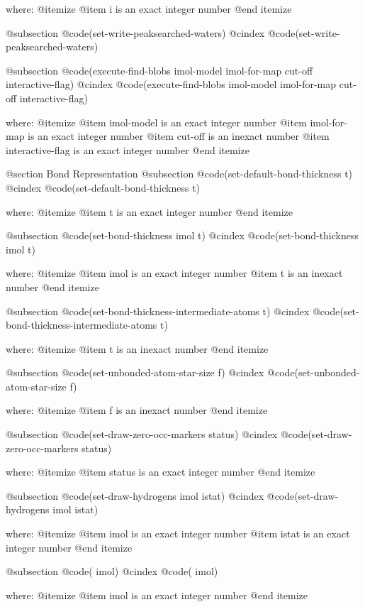 where: 
 @itemize 
     @item i is an exact integer number
 @end itemize


@subsection @code{(set-write-peaksearched-waters)}
@cindex @code{(set-write-peaksearched-waters)}
 
@subsection @code{(execute-find-blobs imol-model imol-for-map cut-off interactive-flag)}
@cindex @code{(execute-find-blobs imol-model imol-for-map cut-off interactive-flag)}
 
where: 
 @itemize 
     @item imol-model is an exact integer number
     @item imol-for-map is an exact integer number
     @item cut-off is an inexact number
     @item interactive-flag is an exact integer number
 @end itemize



@section Bond Representation 
@subsection @code{(set-default-bond-thickness t)}
@cindex @code{(set-default-bond-thickness t)}
 
where: 
 @itemize 
     @item t is an exact integer number
 @end itemize


@subsection @code{(set-bond-thickness imol t)}
@cindex @code{(set-bond-thickness imol t)}
 
where: 
 @itemize 
     @item imol is an exact integer number
     @item t is an inexact number
 @end itemize


@subsection @code{(set-bond-thickness-intermediate-atoms t)}
@cindex @code{(set-bond-thickness-intermediate-atoms t)}
 
where: 
 @itemize 
     @item t is an inexact number
 @end itemize


@subsection @code{(set-unbonded-atom-star-size f)}
@cindex @code{(set-unbonded-atom-star-size f)}
 
where: 
 @itemize 
     @item f is an inexact number
 @end itemize


@subsection @code{(set-draw-zero-occ-markers status)}
@cindex @code{(set-draw-zero-occ-markers status)}
 
where: 
 @itemize 
     @item status is an exact integer number
 @end itemize


@subsection @code{(set-draw-hydrogens imol istat)}
@cindex @code{(set-draw-hydrogens imol istat)}
 
where: 
 @itemize 
     @item imol is an exact integer number
     @item istat is an exact integer number
 @end itemize


@subsection @code{( imol)}
@cindex @code{( imol)}
 
where: 
 @itemize 
     @item imol is an exact integer number
 @end itemize


